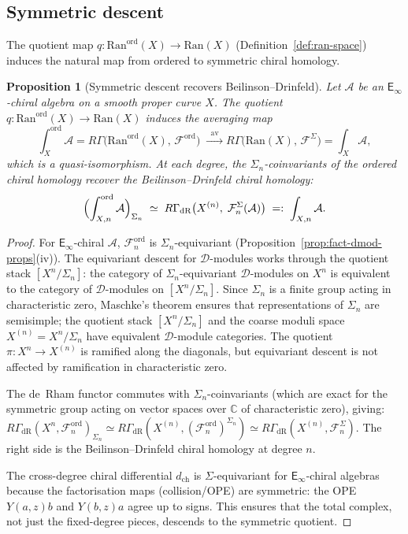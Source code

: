 \documentclass[11pt,reqno]{amsart}
\newtheorem{proposition}[theorem]{Proposition}
\theoremstyle{definition}
\theoremstyle{remark}
\newcommand{\cA}{\mathcal{A}}
\newcommand{\cD}{\mathcal{D}}
\newcommand{\cF}{\mathcal{F}}
\newcommand{\Ran}{\mathrm{Ran}}
\newcommand{\Einf}{\mathsf{E}_{\infty}}
\DeclareMathOperator{\av}{av}
\newcommand{\CC}{\mathbb{C}}
\numberwithin{equation}{section}
\begin{document}
\subsection{Symmetric descent}
\label{subsec:sym-descent}

The quotient map
$q \colon \Ran^{\mathrm{ord}}(X) \to \Ran(X)$
(Definition~\ref{def:ran-space}) induces the natural map
from ordered to symmetric chiral homology.

\begin{proposition}[Symmetric descent recovers
Beilinson--Drinfeld]
\label{prop:sym-descent}
Let $\cA$ be an $\Einf$-chiral algebra on a smooth
proper curve $X$. The quotient
$q \colon \Ran^{\mathrm{ord}}(X) \to \Ran(X)$
induces the averaging map
\begin{equation}\label{eq:sym-descent-ran}
  \int_X^{\mathrm{ord}} \cA
  = R\Gamma\bigl(\Ran^{\mathrm{ord}}(X),\,
  \cF^{\mathrm{ord}}\bigr)
  \;\xrightarrow{\;\;\av\;\;}
  R\Gamma\bigl(\Ran(X),\,
  \cF^{\Sigma}\bigr)
  = \int_X \cA,
\end{equation}
which is a quasi-isomorphism. At each degree, the
$\Sigma_n$-coinvariants of the ordered chiral homology
recover the Beilinson--Drinfeld chiral homology:
\begin{equation}\label{eq:sym-descent}
  \Bigl(\int_{X,n}^{\mathrm{ord}} \cA\Bigr)_{\Sigma_n}
  \;\simeq\;
  R\Gamma_{\mathrm{dR}}\bigl(X^{(n)},\;
  \cF_n^{\Sigma}(\cA)\bigr)
  \;=:\;
  \int_{X,n} \cA.
\end{equation}
\end{proposition}

\begin{proof}
For $\Einf$-chiral $\cA$,
$\cF_n^{\mathrm{ord}}$ is $\Sigma_n$-equivariant
(Proposition~\ref{prop:fact-dmod-props}(iv)).
The equivariant descent for $\cD$-modules works through the
quotient stack $[X^n / \Sigma_n]$: the category of
$\Sigma_n$-equivariant $\cD$-modules on $X^n$ is equivalent
to the category of $\cD$-modules on $[X^n / \Sigma_n]$.
Since $\Sigma_n$ is a finite group acting in characteristic
zero, Maschke's theorem ensures that representations of
$\Sigma_n$ are semisimple; the quotient stack
$[X^n / \Sigma_n]$ and the coarse moduli space
$X^{(n)} = X^n / \Sigma_n$ have equivalent $\cD$-module
categories. The quotient $\pi \colon X^n \to X^{(n)}$ is
ramified along the diagonals, but equivariant descent
is not affected by ramification in characteristic zero.

The de~Rham functor commutes with
$\Sigma_n$-coinvariants (which are exact for the symmetric
group acting on vector spaces over $\CC$ of
characteristic zero), giving:
$R\Gamma_{\mathrm{dR}}(X^n,
\cF_n^{\mathrm{ord}})_{\Sigma_n}
\simeq
R\Gamma_{\mathrm{dR}}(X^{(n)},
(\cF_n^{\mathrm{ord}})^{\Sigma_n})
\simeq
R\Gamma_{\mathrm{dR}}(X^{(n)},
\cF_n^{\Sigma})$.
The right side is the Beilinson--Drinfeld chiral
homology at degree $n$.

The cross-degree chiral differential $d_{\mathrm{ch}}$
is $\Sigma$-equivariant for $\Einf$-chiral algebras
because the factorisation maps (collision/OPE) are
symmetric: the OPE $Y(a,z)b$ and $Y(b,z)a$ agree up to
signs. This ensures that the total complex, not just
the fixed-degree pieces, descends to the symmetric quotient.
\end{proof}
\end{document}
